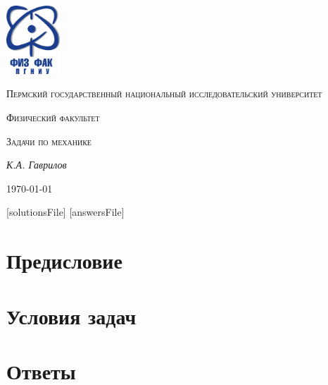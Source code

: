\documentclass[a5paper, oneside]{book}
\begin{document}
\begin{titlepage}
	\centering
	\includegraphics[width=0.15\textwidth]{logo.png}\par\vspace{1cm}
	{\scshape Пермский государственный национальный исследовательский университет\par}
	\vspace{0.5cm}
	{\scshape Физический факультет \par}
	\vspace{1cm}
	{\scshape\LARGE Задачи по механике\par}
	\vspace{2cm}
	{\Large\itshape К.А. Гаврилов\par}
	\vfill
	{\large \today\par}
\end{titlepage}

\tableofcontents    %

[solutionsFile]
[answersFile]

\chapter*{Предисловие}


\chapter*{Условия задач}














\chapter*{Ответы}
\end{document}
